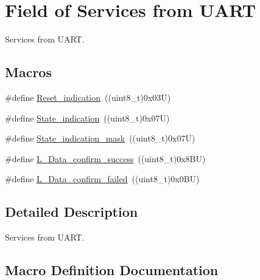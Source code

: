 \hypertarget{group___u_a_r_t___control___from}{}\section{Field of Services from U\+A\+RT}
\label{group___u_a_r_t___control___from}


Services from U\+A\+RT.  


\subsection*{Macros}
\begin{DoxyCompactItemize}
\item 
\#define \hyperlink{group___u_a_r_t___control___from_gade9c58399a01abdaa03bbecbf63879c3}{Reset\+\_\+indication}~((uint8\+\_\+t)0x03\+U)
\item 
\#define \hyperlink{group___u_a_r_t___control___from_ga736e177182335771d7948dd74a7a1a5f}{State\+\_\+indication}~((uint8\+\_\+t)0x07\+U)
\item 
\#define \hyperlink{group___u_a_r_t___control___from_gac1dc46273764bf13be2f30fcc60806a4}{State\+\_\+indication\+\_\+mask}~((uint8\+\_\+t)0x07\+U)
\item 
\#define \hyperlink{group___u_a_r_t___control___from_ga5bef931d5b249bb5d33e68f5262d8ec7}{L\+\_\+\+Data\+\_\+confirm\+\_\+success}~((uint8\+\_\+t)0x8\+B\+U)
\item 
\#define \hyperlink{group___u_a_r_t___control___from_ga6c0c4d47e20c528c12b4cb786930530a}{L\+\_\+\+Data\+\_\+confirm\+\_\+failed}~((uint8\+\_\+t)0x0\+B\+U)
\end{DoxyCompactItemize}


\subsection{Detailed Description}
Services from U\+A\+RT. 



\subsection{Macro Definition Documentation}
